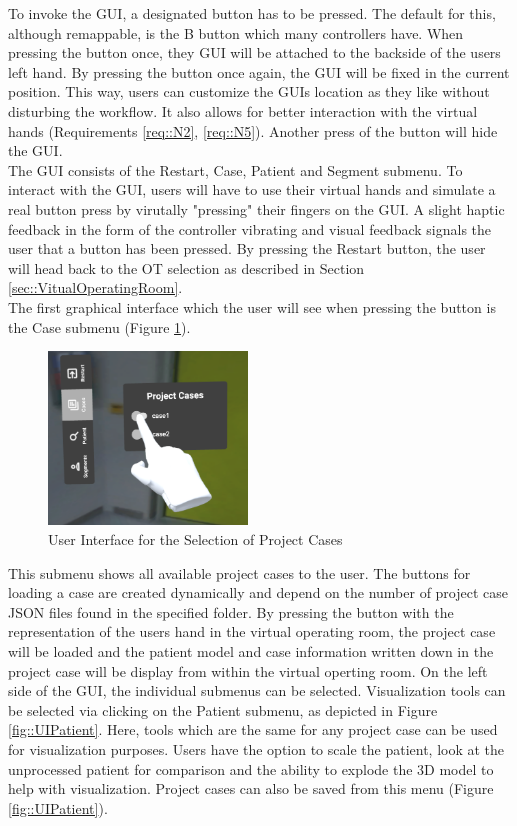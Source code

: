 To invoke the GUI, a designated button has to be pressed.
The default for this, although remappable, is the B button which many controllers have.
When pressing the button once, they GUI will be attached to the backside of the users left hand.
By pressing the button once again, the GUI will be fixed in the current position.
This way, users can customize the GUIs location as they like without disturbing the workflow.
It also allows for better interaction with the virtual hands (Requirements \ref{req::N2}, \ref{req::N5}).
Another press of the button will hide the GUI.
\\ The GUI consists of the Restart, Case, Patient and Segment submenu.
To interact with the GUI, users will have to use their virtual hands and simulate a real button press by virutally "pressing" their fingers on the GUI.
A slight haptic feedback in the form of the controller vibrating and visual feedback signals the user that a button has been pressed.
By pressing the Restart button, the user will head back to the OT selection as described in Section \ref{sec::VitualOperatingRoom}.
\\ The first graphical interface which the user will see when pressing the button is the Case submenu (Figure \ref{fig::UIProjectCase}).
\begin{figure}[ht]
    \centering
    \includegraphics[width=200px]{images/implementation/user_interface/project_cases.png}
    \caption{\label{fig::UIProjectCase}User Interface for the Selection of Project Cases}
\end{figure}

This submenu shows all available project cases to the user.
The buttons for loading a case are created dynamically and depend on the number of project case JSON files found in the specified folder.
By pressing the button with the representation of the users hand in the virtual operating room, the project case will be loaded and the patient model and case information written down in the project case will be display from within the virtual operting room.
On the left side of the GUI, the individual submenus can be selected.
Visualization tools can be selected via clicking on the Patient submenu, as depicted in Figure \ref{fig::UIPatient}.
Here, tools which are the same for any project case can be used for visualization purposes.
Users have the option to scale the patient, look at the unprocessed patient for comparison and the ability to explode the 3D model to help with visualization.
Project cases can also be saved from this menu (Figure \ref{fig::UIPatient}).

